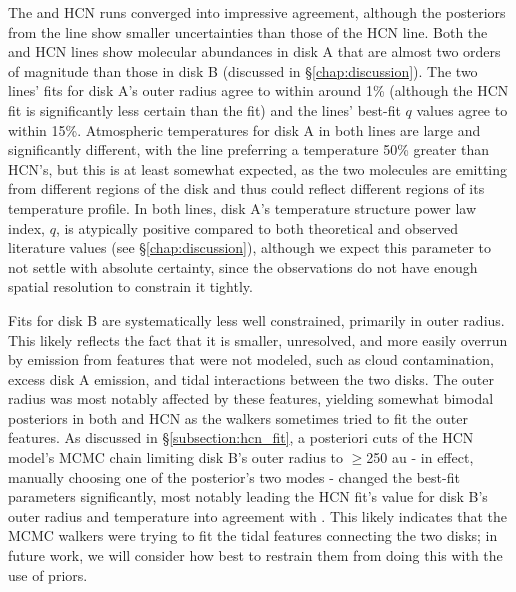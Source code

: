 The \hco and HCN runs converged into impressive agreement, although the posteriors from the \hco line show smaller uncertainties than those of the HCN line. Both the \hco and HCN lines show molecular abundances in disk A that are almost two orders of magnitude than those in disk B (discussed in \S\ref{chap:discussion}). The two lines' fits for disk A's outer radius agree to within around 1\% (although the HCN fit is significantly less certain than the \hco fit) and the lines' best-fit $q$ values agree to within 15\%. Atmospheric temperatures for disk A in both lines are large and significantly different, with the \hco line preferring a temperature 50\% greater than HCN's, but this is at least somewhat expected, as the two molecules are emitting from different regions of the disk and thus could reflect different regions of its temperature profile. In both lines, disk A's temperature structure power law index, $q$, is atypically positive compared to both theoretical and observed literature values (see \S\ref{chap:discussion}), although we expect this parameter to not settle with absolute certainty, since the observations do not have enough spatial resolution to constrain it tightly.


Fits for disk B are systematically less well constrained, primarily in outer radius. This likely reflects the fact that it is smaller, unresolved, and more easily overrun by emission from features that were not modeled, such as cloud contamination, excess disk A emission, and tidal interactions between the two disks. The outer radius was most notably affected by these features, yielding somewhat bimodal posteriors in both \hco and HCN as the walkers sometimes tried to fit the outer features. As discussed in \S\ref{subsection:hcn_fit}, a posteriori cuts of the HCN model's MCMC chain limiting disk B's outer radius to $\geq$250 au - in effect, manually choosing one of the posterior's two modes -  changed the best-fit parameters significantly, most notably leading the HCN fit's value for disk B's outer radius and temperature into agreement with \hco. This likely indicates that the MCMC walkers were trying to fit the tidal features connecting the two disks; in future work, we will consider how best to restrain them from doing this with the use of priors.


